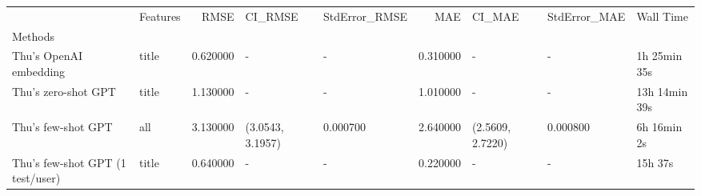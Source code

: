 \begin{tabular}{llrllrlll}
 & Features & RMSE & CI_RMSE & StdError_RMSE & MAE & CI_MAE & StdError_MAE & Wall Time \\
Methods &  &  &  &  &  &  &  &  \\
Thu's OpenAI embedding & title & 0.620000 & - & - & 0.310000 & - & - & 1h 25min 35s \\
Thu's zero-shot GPT & title & 1.130000 & - & - & 1.010000 & - & - & 13h 14min 39s \\
Thu's few-shot GPT & all & 3.130000 & (3.0543, 3.1957) & 0.000700 & 2.640000 & (2.5609, 2.7220) & 0.000800 & 6h 16min 2s \\
Thu's few-shot GPT (1 test/user) & title & 0.640000 & - & - & 0.220000 & - & - & 15h 37s \\
\end{tabular}
